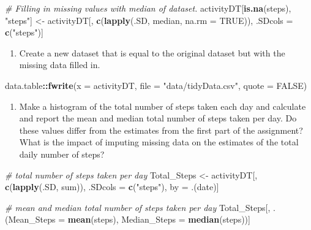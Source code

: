 \documentclass[
]{article}
\newenvironment{Shaded}{\begin{snugshade}}{\end{snugshade}}
\newcommand{\CommentTok}[1]{\textcolor[rgb]{0.56,0.35,0.01}{\textit{#1}}}
\newcommand{\DataTypeTok}[1]{\textcolor[rgb]{0.13,0.29,0.53}{#1}}
\newcommand{\KeywordTok}[1]{\textcolor[rgb]{0.13,0.29,0.53}{\textbf{#1}}}
\newcommand{\NormalTok}[1]{#1}
\newcommand{\OperatorTok}[1]{\textcolor[rgb]{0.81,0.36,0.00}{\textbf{#1}}}
\newcommand{\OtherTok}[1]{\textcolor[rgb]{0.56,0.35,0.01}{#1}}
\newcommand{\StringTok}[1]{\textcolor[rgb]{0.31,0.60,0.02}{#1}}
\providecommand{\tightlist}{%
  \setlength{\itemsep}{0pt}\setlength{\parskip}{0pt}}
\begin{document}
\begin{Shaded}
\begin{Highlighting}[]
\CommentTok{# Filling in missing values with median of dataset. }
\NormalTok{activityDT[}\KeywordTok{is.na}\NormalTok{(steps), }\StringTok{"steps"}\NormalTok{] <-}\StringTok{ }\NormalTok{activityDT[, }\KeywordTok{c}\NormalTok{(}\KeywordTok{lapply}\NormalTok{(.SD, median, }\DataTypeTok{na.rm =} \OtherTok{TRUE}\NormalTok{)), .SDcols =}\StringTok{ }\KeywordTok{c}\NormalTok{(}\StringTok{"steps"}\NormalTok{)]}
\end{Highlighting}
\end{Shaded}

\begin{enumerate}
\def\labelenumi{\arabic{enumi}.}
\setcounter{enumi}{2}
\tightlist
\item
  Create a new dataset that is equal to the original dataset but with
  the missing data filled in.
\end{enumerate}

\begin{Shaded}
\begin{Highlighting}[]
\NormalTok{data.table}\OperatorTok{::}\KeywordTok{fwrite}\NormalTok{(}\DataTypeTok{x =}\NormalTok{ activityDT, }\DataTypeTok{file =} \StringTok{"data/tidyData.csv"}\NormalTok{, }\DataTypeTok{quote =} \OtherTok{FALSE}\NormalTok{)}
\end{Highlighting}
\end{Shaded}

\begin{enumerate}
\def\labelenumi{\arabic{enumi}.}
\setcounter{enumi}{3}
\tightlist
\item
  Make a histogram of the total number of steps taken each day and
  calculate and report the mean and median total number of steps taken
  per day. Do these values differ from the estimates from the first part
  of the assignment? What is the impact of imputing missing data on the
  estimates of the total daily number of steps?
\end{enumerate}

\begin{Shaded}
\begin{Highlighting}[]
\CommentTok{# total number of steps taken per day}
\NormalTok{Total_Steps <-}\StringTok{ }\NormalTok{activityDT[, }\KeywordTok{c}\NormalTok{(}\KeywordTok{lapply}\NormalTok{(.SD, sum)), .SDcols =}\StringTok{ }\KeywordTok{c}\NormalTok{(}\StringTok{"steps"}\NormalTok{), by =}\StringTok{ }\NormalTok{.(date)] }

\CommentTok{# mean and median total number of steps taken per day}
\NormalTok{Total_Steps[, .(}\DataTypeTok{Mean_Steps =} \KeywordTok{mean}\NormalTok{(steps), }\DataTypeTok{Median_Steps =} \KeywordTok{median}\NormalTok{(steps))]}
\end{Highlighting}
\end{Shaded}
\end{document}
